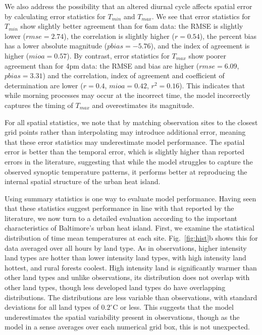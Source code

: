 We also address the possibility that an altered diurnal cycle affects spatial error by calculating error statistics for $T_{min}$ and $T_{max}$. We see that error statistics for $T_{min}$ show slightly better agreement than for 6am data: the RMSE is slightly lower ($rmse = 2.74$), the correlation is slightly higher ($r=0.54$), the percent bias has a lower absolute magnitude ($pbias=-5.76$), and the index of agreement is higher ($mioa=0.57$). By contrast, error statistics for $T_{max}$ show poorer agreement than for 4pm data: 
the RMSE and bias are higher ($rmse=6.09$, $pbias=3.31$) and the correlation, index of agreement and coefficient of determination are lower ($r=0.4$, $mioa=0.42$, $r^2=0.16$). 
This indicates that while morning processes may occur at the incorrect time, the model incorrectly captures the timing of $T_{max}$ and overestimates its magnitude. 

For all spatial statistics, we note that by matching observation sites to the closest grid points rather than interpolating may introduce additional error, meaning that these error statistics may underestimate model performance. %
The spatial error is better than the temporal error, which is slightly higher than reported errors in the literature, 
suggesting that while the model struggles to capture the observed synoptic temperature patterns, it performs better at reproducing the internal spatial structure of the urban heat island.

Using summary statistics is one way to evaluate model performance. Having seen that these statistics suggest performance in line with that reported by the literature, we now turn to a detailed evaluation according to the important characteristics of Baltimore's urban heat island. 
First, we examine the statistical distribution of time mean temperatures at each site. Fig.~\ref{fig:hist}b shows this for data averaged over all hours by land type. As in observations, higher intensity land types are hotter than lower intensity land types, with high intensity land hottest, and rural forests coolest. High intensity land is significantly warmer than other land types and unlike observations, its distribution does not overlap with other land types, though less developed land types do have overlapping distributions. 
The distributions are less variable than observations, with standard deviations for all land types of $0.2^\circ$C or less. This suggests that the model underestimates the spatial variability present in observations, though as the model in a sense averages over each numerical grid box, this is not unexpected. 

